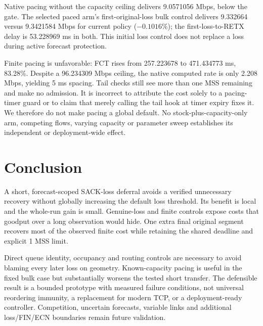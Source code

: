 \documentclass[conference]{IEEEtran}
\begin{document}
Native pacing without the capacity ceiling delivers 9.0571056 Mbps,
below the gate. The selected paced arm's first-original-loss bulk
control delivers 9.332664 versus 9.3421584 Mbps for current policy
($-0.1016\%$); the first-loss-to-RETX delay is 53.228969 ms in both.
This initial loss control does not replace a loss during active
forecast protection.

Finite pacing is unfavorable: FCT rises from 257.223678 to 471.434773 ms,
83.28\%. Despite a 96.234309 Mbps ceiling, the native computed rate is
only 2.208 Mbps, yielding 5 ms spacing. Tail checks still see more than
one MSS remaining and make no admission. It is incorrect to attribute
the cost solely to a pacing-timer guard or to claim that merely calling
the tail hook at timer expiry fixes it. We therefore do not make pacing
a global default. No stock-plus-capacity-only arm, competing flows,
varying capacity or parameter sweep establishes its independent or
deployment-wide effect.



\balance
\section{Conclusion}
A short, forecast-scoped SACK-loss deferral avoids a verified unnecessary
recovery without globally increasing the default loss threshold. Its
benefit is local and the whole-run gain is small. Genuine-loss and finite
controls expose costs that goodput over a long observation would hide.
One extra final original segment recovers most of the observed finite
cost while retaining the shared deadline and explicit 1 MSS limit.

Direct queue identity, occupancy and routing controls are necessary to
avoid blaming every later loss on geometry. Known-capacity pacing is
useful in the fixed bulk case but substantially worsens the tested short
transfer. The defensible result is a bounded prototype with measured
failure conditions, not universal reordering immunity, a replacement for
modern TCP, or a deployment-ready controller. Competition, uncertain
forecasts, variable links and additional loss/FIN/ECN boundaries remain
future validation.
\end{document}
